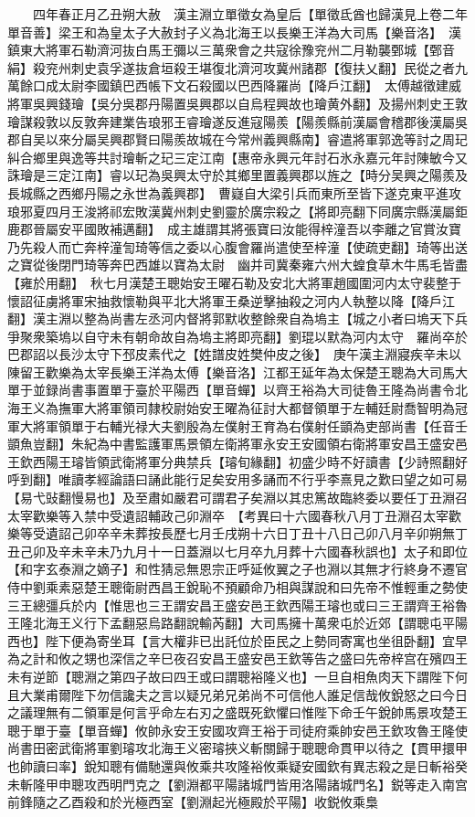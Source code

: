 　　四年春正月乙丑朔大赦　漢主淵立單徵女為皇后【單徵氐酋也歸漢見上卷二年單音善】梁王和為皇太子大赦封子义為北海王以長樂王洋為大司馬【樂音洛】　漢鎮東大將軍石勒濟河抜白馬王彌以三萬衆會之共寇徐豫兖州二月勒襲鄄城【鄄音絹】殺兖州刺史袁孚遂抜倉垣殺王堪復北濟河攻冀州諸郡【復扶乂翻】民從之者九萬餘口成太尉李國鎮巴西帳下文石殺國以巴西降羅尚【降戶江翻】　太傅越徵建威將軍吳興錢璯【吳分吳郡丹陽置吳興郡以自烏程興故也璯黄外翻】及揚州刺史王敦璯謀殺敦以反敦奔建業告琅邪王睿璯遂反進寇陽羨【陽羨縣前漢屬會稽郡後漢屬吳郡自吴以來分屬吴興郡賢曰陽羨故城在今常州義興縣南】睿遣將軍郭逸等討之周玘糾合鄉里與逸等共討璯斬之玘三定江南【惠帝永興元年討石氷永嘉元年討陳敏今又誅璯是三定江南】睿以玘為吳興太守於其鄉里置義興郡以旌之【時分吴興之陽羨及長城縣之西鄉丹陽之永世為義興郡】　曹嶷自大梁引兵而東所至皆下遂克東平進攻琅邪夏四月王浚將祁宏敗漢冀州刺史劉靈於廣宗殺之【將即亮翻下同廣宗縣漢屬鉅鹿郡晉屬安平國敗補邁翻】　成主雄謂其將張寶曰汝能得梓潼吾以李離之官賞汝寶乃先殺人而亡奔梓潼訇琦等信之委以心腹會羅尚遣使至梓潼【使疏吏翻】琦等出送之寶從後閉門琦等奔巴西雄以寶為太尉　幽并司冀秦雍六州大蝗食草木牛馬毛皆盡【雍於用翻】　秋七月漢楚王聰始安王曜石勒及安北大將軍趙國圍河内太守裴整于懷詔征虜將軍宋抽救懷勒與平北大將軍王桑逆擊抽殺之河内人執整以降【降戶江翻】漢主淵以整為尚書左丞河内督將郭默收整餘衆自為塢主【城之小者曰塢天下兵爭聚衆築塢以自守未有朝命故自為塢主將即亮翻】劉琨以默為河内太守　羅尚卒於巴郡詔以長沙太守下邳皮素代之【姓譜皮姓樊仲皮之後】　庚午漢主淵寢疾辛未以陳留王歡樂為太宰長樂王洋為太傅【樂音洛】江都王延年為太保楚王聰為大司馬大單于並録尚書事置單于臺於平陽西【單音蟬】以齊王裕為大司徒魯王隆為尚書令北海王义為撫軍大將軍領司隸校尉始安王曜為征討大都督領單于左輔廷尉喬智明為冠軍大將軍領單于右輔光禄大夫劉殷為左僕射王育為右僕射任顗為吏部尚書【任音壬顗魚豈翻】朱紀為中書監護軍馬景領左衛將軍永安王安國領右衛將軍安昌王盛安邑王欽西陽王璿皆領武衛將軍分典禁兵【璿旬緣翻】初盛少時不好讀書【少詩照翻好呼到翻】唯讀孝經論語曰誦此能行足矣安用多誦而不行乎李熹見之歎曰望之如可易【易弋䜴翻慢易也】及至肅如嚴君可謂君子矣淵以其忠篤故臨終委以要任丁丑淵召太宰歡樂等入禁中受遺詔輔政己卯淵卒　【考異曰十六國春秋八月丁丑淵召太宰歡樂等受遺詔己卯卒辛未葬按長歷七月壬戌朔十六日丁丑十八日己卯八月辛卯朔無丁丑己卯及辛未辛未乃九月十一日蓋淵以七月卒九月葬十六國春秋誤也】太子和即位【和字玄泰淵之嫡子】和性猜忌無恩宗正呼延攸翼之子也淵以其無才行終身不遷官侍中劉乘素惡楚王聰衛尉西昌王銳恥不預顧命乃相與謀說和曰先帝不惟輕重之勢使三王總彊兵於内【惟思也三王謂安昌王盛安邑王欽西陽王璿也或曰三王謂齊王裕魯王隆北海王义行下孟翻惡烏路翻說輸芮翻】大司馬擁十萬衆屯於近郊【謂聰屯平陽西也】陛下便為寄坐耳【言大權非已出託位於臣民之上勢同寄寓也坐徂卧翻】宜早為之計和攸之甥也深信之辛巳夜召安昌王盛安邑王欽等告之盛曰先帝梓宫在殯四王未有逆節【聰淵之第四子故曰四王或曰謂聰裕隆义也】一旦自相魚肉天下謂陛下何且大業甫爾陛下勿信讒夫之言以疑兄弟兄弟尚不可信他人誰足信哉攸銳怒之曰今日之議理無有二領軍是何言乎命左右刃之盛既死欽懼曰惟陛下命壬午銳帥馬景攻楚王聰于單于臺【單音蟬】攸帥永安王安國攻齊王裕于司徒府乘帥安邑王欽攻魯王隆使尚書田密武衛將軍劉璿攻北海王义密璿挾义斬關歸于聰聰命貫甲以待之【貫甲擐甲也帥讀曰率】銳知聰有備馳還與攸乘共攻隆裕攸乘疑安國欽有異志殺之是日斬裕癸未斬隆甲申聰攻西明門克之【劉淵都平陽諸城門皆用洛陽諸城門名】鋭等走入南宫前鋒隨之乙酉殺和於光極西室【劉淵起光極殿於平陽】收鋭攸乘梟